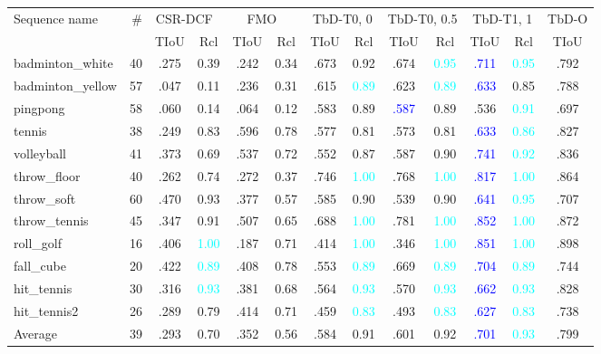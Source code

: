 \documentclass[10pt,twocolumn,letterpaper]{article}
\begin{document}
\begin{table*}
\begin{center}
\begin{tabular}{l|r|c|c|c|c|c|c|c|c|c|c|c}
\hline
\multirow{2}{*}{Sequence name} & \multirow{2}{*}{\#} & \multicolumn{2}{c|}{CSR-DCF~\cite{csrdcf}}  & \multicolumn{2}{c|}{FMO~\cite{fmo}} & \multicolumn{2}{c|}{TbD-T0, 0} & \multicolumn{2}{c|}{TbD-T0, 0.5} & \multicolumn{2}{c|}{TbD-T1, 1} & TbD-O \\  \cline{3-13}
 & & TIoU & Rcl & TIoU & Rcl & TIoU & Rcl & TIoU & Rcl & TIoU & Rcl & TIoU \\ \hline

badminton\_white & 40 & .275 & 0.39 & .242 & 0.34 & .673 & 0.92 & .674 & \textcolor{cyan}{0.95} & \textcolor{blue}{.711} & \textcolor{cyan}{0.95} & .792\\  
 badminton\_yellow & 57 & .047 & 0.11 & .236 & 0.31 & .615 & \textcolor{cyan}{0.89} & .623 & \textcolor{cyan}{0.89} & \textcolor{blue}{.633} & 0.85 & .788\\  
 pingpong & 58 & .060 & 0.14 & .064 & 0.12 & .583 & 0.89 & \textcolor{blue}{.587} & 0.89 & .536 & \textcolor{cyan}{0.91} & .697\\  
 tennis & 38 & .249 & 0.83 & .596 & 0.78 & .577 & 0.81 & .573 & 0.81 & \textcolor{blue}{.633} & \textcolor{cyan}{0.86} & .827\\  
 volleyball & 41 & .373 & 0.69 & .537 & 0.72 & .552 & 0.87 & .587 & 0.90 & \textcolor{blue}{.741} & \textcolor{cyan}{0.92} & .836\\  
 throw\_floor & 40 & .262 & 0.74 & .272 & 0.37 & .746 & \textcolor{cyan}{1.00} & .768 & \textcolor{cyan}{1.00} & \textcolor{blue}{.817} & \textcolor{cyan}{1.00} & .864\\  
 throw\_soft & 60 & .470 & 0.93 & .377 & 0.57 & .585 & 0.90 & .539 & 0.90 & \textcolor{blue}{.641} & \textcolor{cyan}{0.95} & .707\\  
 throw\_tennis & 45 & .347 & 0.91 & .507 & 0.65 & .688 & \textcolor{cyan}{1.00} & .781 & \textcolor{cyan}{1.00} & \textcolor{blue}{.852} & \textcolor{cyan}{1.00} & .872\\  
 roll\_golf & 16 & .406 & \textcolor{cyan}{1.00} & .187 & 0.71 & .414 & \textcolor{cyan}{1.00} & .346 & \textcolor{cyan}{1.00} & \textcolor{blue}{.851} & \textcolor{cyan}{1.00} & .898\\  
 fall\_cube & 20 & .422 & \textcolor{cyan}{0.89} & .408 & 0.78 & .553 & \textcolor{cyan}{0.89} & .669 & \textcolor{cyan}{0.89} & \textcolor{blue}{.704} & \textcolor{cyan}{0.89} & .744\\  
 hit\_tennis & 30 & .316 & \textcolor{cyan}{0.93} & .381 & 0.68 & .564 & \textcolor{cyan}{0.93} & .570 & \textcolor{cyan}{0.93} & \textcolor{blue}{.662} & \textcolor{cyan}{0.93} & .828\\  
 hit\_tennis2 & 26 & .289 & 0.79 & .414 & 0.71 & .459 & \textcolor{cyan}{0.83} & .493 & \textcolor{cyan}{0.83} & \textcolor{blue}{.627} & \textcolor{cyan}{0.83} & .738\\  
 \hline 
  Average  & 39 & .293 & 0.70 & .352 & 0.56 & .584 & 0.91 & .601 & 0.92 & \textcolor{blue}{.701} & \textcolor{cyan}{0.93} & .799\\



\end{tabular}
\end{center}
\end{table*}
\end{document}
